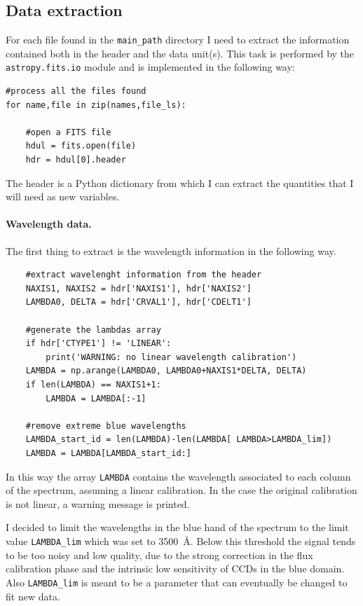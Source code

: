 \subsection{Data extraction}
For each file found in the \texttt{main\_path} directory I need to extract the information contained both in the header and the data unit(s). This task is performed by the \texttt{astropy.fits.io} module and is implemented in the following way:
\begin{lstlisting}
#process all the files found
for name,file in zip(names,file_ls):

	#open a FITS file
	hdul = fits.open(file)
	hdr = hdul[0].header
\end{lstlisting}
The header is a Python dictionary from which I can extract the quantities that I will need as new variables.

\paragraph{Wavelength data.} The first thing to extract is the wavelength information in the following way.
\begin{lstlisting}
	#extract wavelenght information from the header
	NAXIS1, NAXIS2 = hdr['NAXIS1'], hdr['NAXIS2']
	LAMBDA0, DELTA = hdr['CRVAL1'], hdr['CDELT1']
	
	#generate the lambdas array
	if hdr['CTYPE1'] != 'LINEAR':
		print('WARNING: no linear wavelength calibration')    
	LAMBDA = np.arange(LAMBDA0, LAMBDA0+NAXIS1*DELTA, DELTA)
	if len(LAMBDA) == NAXIS1+1:
		LAMBDA = LAMBDA[:-1]
	
	#remove extreme blue wavelengths
	LAMBDA_start_id = len(LAMBDA)-len(LAMBDA[ LAMBDA>LAMBDA_lim])
	LAMBDA = LAMBDA[LAMBDA_start_id:]
\end{lstlisting}
In this way the array \texttt{LAMBDA} contains the wavelength associated to each column of the spectrum, assuming a linear calibration. In the case the original calibration is not linear, a warning message is printed.

I decided to limit the wavelengths in the blue hand of the spectrum to the limit value \texttt{LAMBDA\_lim} which was set to \SI{3500}{\angstrom}. Below this threshold the signal tends to be too noisy and low quality, due to the strong correction in the flux calibration phase and the intrinsic low sensitivity of CCDs in the blue domain. Also \texttt{LAMBDA\_lim} is meant to be a parameter that can eventually be changed to fit new data.

